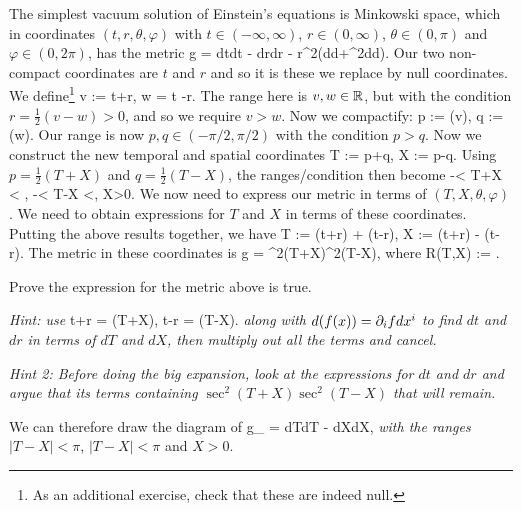 The simplest vacuum solution of Einstein's equations is Minkowski space, which in coordinates $(t,r,\theta,\varphi)$ with $t\in(-\infty,\infty)$, $r\in(0,\infty)$, $\theta\in(0,\pi)$ and $\varphi\in(0,2\pi)$, has the metric 
\bse 
    g = dt\otimes dt - dr\otimes dr - r^2\big(d\theta\otimes d\theta +\sin^2\theta d\varphi\otimes d\varphi\big).
\ese 
Our two non-compact coordinates are $t$ and $r$ and so it is these we replace by null coordinates. We define\footnote{As an additional exercise, check that these are indeed null.} 
\bse 
    v := t+r, \qand w = t -r.
\ese 
The range here is $v,w\in\mathbb{R}$, but with the condition $r=\frac{1}{2}(v-w)>0$, and so we require $v>w$. Now we compactify: 
\bse 
    p := \arctan(v), \qand q := \arctan(w).
\ese
Our range is now $p,q\in(-\pi/2,\pi/2)$ with the condition $p>q$. Now we construct the new temporal and spatial coordinates
\bse 
    T := p+q, \qand X := p-q.
\ese 
Using $p=\frac{1}{2}(T+X)$ and $q=\frac{1}{2}(T-X)$, the ranges/condition then become 
\bse 
    -\pi < T+X < \pi, \qquad -\pi < T-X <\pi, \qand X>0.
\ese 
We now need to express our metric in terms of $(T,X,\theta,\varphi)$. We need to obtain expressions for $T$ and $X$ in terms of these coordinates. Putting the above results together, we have
\bse 
    T := \arctan(t+r) + \arctan(t-r), \qand X := \arctan(t+r) - \arctan(t-r).
\ese 
The metric in these coordinates is 
\bse 
    g = \sec^2(T+X)\sec^2(T-X),
\ese 
where 
\bse 
    R(T,X) := .
\ese 

\bbox 
    Prove the expression for the metric above is true. 
    
    \textit{Hint: use}
    \bse 
        t+r = \tan(T+X), \qand t-r = \tan(T-X).
    \ese 
    \textit{along with $d(f(x)) = \partial_ifdx^i$ to find $dt$ and $dr$ in terms of $dT$ and $dX$, then multiply out all the terms and cancel.}
    
    \textit{Hint 2: Before doing the big expansion, look at the expressions for $dt$ and $dr$ and argue that its terms containing $\sec^2(T+X)\sec^2(T-X)$ that will remain.}
\ebox 

We can therefore draw the diagram of 
\bse 
    g_{} = dT\otimes dT - dX\otimes dX,
\ese
\textit{with the ranges} $|T-X|<\pi$, $|T-X|<\pi$ and $X>0$.

